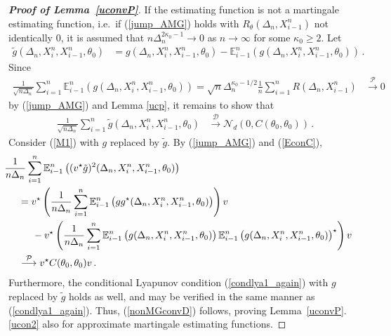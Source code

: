 \documentclass[11pt,a4paper]{article}
\newcommand{\xtl}{{X^n_{i-1}}}
\newcommand{\xtr}{X^n_i}
\newcommand{\thetan}{{\theta_0}}
\newcommand{\EE}{{\mathbb E}}
\newcommand{\dd}{{\mathcal{D}}}
\newcommand{\nn}{{\mathcal{N}}}
\newcommand{\pp}{{\mathcal{P}}}
\numberwithin{equation}{section}
\numberwithin{theorem}{section}
\begin{document}
\begin{proof}[\textbf{Proof of Lemma~\ref{uconvP}}]
If the estimating function is not a martingale estimating function, i.e.\ if (\ref{jump_AMG}) holds with $R_\theta(\Delta_n,\xtl)$ not identically  $0$, it is assumed that $n\Delta_n^{2{\kappa_0}-1} \to 0$ as $n\to \infty$ for some ${\kappa_0} \geq 2$. Let
\begin{align}
\tilde{g}(\Delta_n,\xtr,\xtl, \thetan) &= g(\Delta_n,\xtr,\xtl, \thetan) - \EE^n_{i-1}\left(g(\Delta_n,\xtr,\xtl,\thetan)\right)\,.
\label{tildeg}
\end{align}
%
Since
\begin{align*}
  \frac{1}{\sqrt{n\Delta_n}} \sum_{i=1}^n \EE^n_{i-1}\left(g(\Delta_n,\xtr,\xtl, \thetan)\right) = \sqrt{n} \Delta_n^{{\kappa_0}-1/2} \frac{1}{n}\sum_{i=1}^n R(\Delta_n,\xtl)
  &\overset{\pp}{\longrightarrow} 0
\end{align*}
%
by (\ref{jump_AMG}) and Lemma \ref{ucp}, it remains to show that
\begin{align}
\frac{1}{\sqrt{n\Delta_n}} \sum_{i=1}^n \tilde{g}(\Delta_n,\xtr,\xtl, \thetan)&\overset{\dd}{\longrightarrow} \nn_d(0,C(\thetan, \thetan))\,.
\label{nonMGconvD}
\end{align}
%
Consider (\ref{M1}) with $g$ replaced by $\tilde{g}$.
%
By (\ref{jump_AMG}) and (\ref{EconC}), 
\begin{align*}
&\hspace{-5mm} \frac{1}{n\Delta_n}\sum_{i=1}^n \EE^n_{i-1}\left((v^\star \tilde{g})^2(\Delta_n, \xtr, \xtl, \thetan)\right)\\
&= v^\star \left( \frac{1}{n\Delta_n}\sum_{i=1}^n \EE^n_{i-1}\left(gg^\star (\Delta_n, \xtr, \xtl, \thetan)\right) \right) v \\
&\hspace{5mm} - v^\star  \left( \frac{1}{n\Delta_n}\sum_{i=1}^n  \EE^n_{i-1}\left(g(\Delta_n, \xtr, \xtl, \thetan) \right) \EE^n_{i-1}\left(g(\Delta_n, \xtr, \xtl, \thetan)\right)^\star \right)v\\
&\overset{\pp}{\longrightarrow} v^\star  C(\thetan,\thetan)v\,.
\end{align*}
%
Furthermore, the conditional Lyapunov condition (\ref{condlya1_again}) with $g$ replaced by $\tilde g$ holds as well, and may be verified in the same manner as (\ref{condlya1_again}). Thus, (\ref{nonMGconvD}) follows, proving Lemma~\ref{uconvP}.\ref{ucon2} also for approximate martingale estimating functions.
\end{proof}
%
\end{document}
